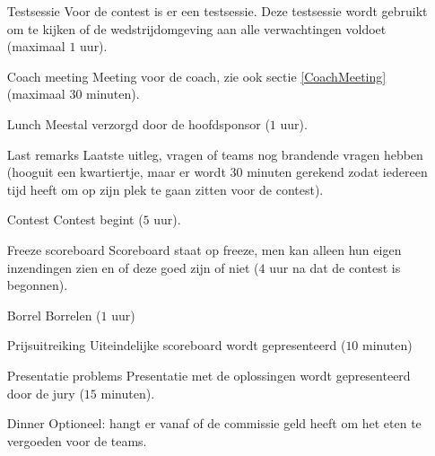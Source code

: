 \begin{itemize}
\item[Testsessie] Voor de contest is er een testsessie. Deze testsessie wordt gebruikt om te kijken of de wedstrijdomgeving aan alle verwachtingen voldoet (maximaal $1$ uur).
\item[Coach meeting] Meeting voor de coach, zie ook sectie \ref{CoachMeeting} (maximaal $30$ minuten).
\item[Lunch] Meestal verzorgd door de hoofdsponsor ($1$ uur).
\item[Last remarks] Laatste uitleg, vragen of teams nog brandende vragen hebben (hooguit een kwartiertje, maar er wordt $30$ minuten gerekend zodat iedereen tijd heeft om op zijn plek te gaan zitten voor de contest).
\item[Contest] Contest begint ($5$ uur).
\item[Freeze scoreboard] Scoreboard staat op freeze, men kan alleen hun eigen inzendingen zien en of deze goed zijn of niet ($4$ uur na dat de contest is begonnen).
\item[Borrel] Borrelen ($1$ uur)
\item[Prijsuitreiking] Uiteindelijke scoreboard wordt gepresenteerd ($10$ minuten)
\item[Presentatie problems] Presentatie met de oplossingen wordt gepresenteerd door de jury ($15$ minuten).
\item[Dinner] Optioneel: hangt er vanaf of de commissie geld heeft om het eten te vergoeden voor de teams.
\end{itemize}